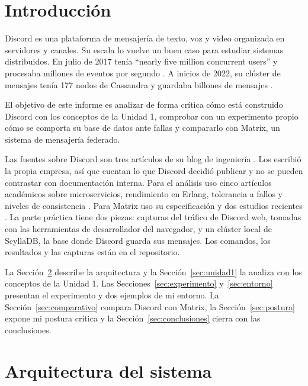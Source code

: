 \documentclass[11pt,a4paper]{article}
\begin{document}
\newpage
\tableofcontents
\newpage


\section{Introducción}\label{sec:introduccion}

Discord es una plataforma de mensajería de texto, voz y video organizada en servidores y canales. Su escala lo vuelve un buen caso para estudiar sistemas distribuidos. En julio de 2017 tenía \enquote{nearly five million concurrent users} y procesaba millones de eventos por segundo \cite{Vishnevskiy2017elixir}. A inicios de 2022, su clúster de mensajes tenía 177 nodos de Cassandra y guardaba billones de mensajes \cite{Ingram2023}.

El objetivo de este informe es analizar de forma crítica cómo está construido Discord con los conceptos de la Unidad 1, comprobar con un experimento propio cómo se comporta su base de datos ante fallas y compararlo con Matrix, un sistema de mensajería federado.

Las fuentes sobre Discord son tres artículos de su blog de ingeniería \cite{Vishnevskiy2017billions,Vishnevskiy2017elixir,Ingram2023}. Los escribió la propia empresa, así que cuentan lo que Discord decidió publicar y no se pueden contrastar con documentación interna. Para el análisis uso cinco artículos académicos sobre microservicios, rendimiento en Erlang, tolerancia a fallos y niveles de consistencia \cite{Blinowski2022,Cazzola2022,Rehman2022,Ferreira2025,Velepucha2023}. Para Matrix uso su especificación \cite{MatrixSpec} y dos estudios recientes \cite{Martins2026,Viana2026}. La parte práctica tiene dos piezas: capturas del tráfico de Discord web, tomadas con las herramientas de desarrollador del navegador, y un clúster local de ScyllaDB, la base donde Discord guarda sus mensajes. Los comandos, los resultados y las capturas están en el repositorio.

La Sección~\ref{sec:arquitectura} describe la arquitectura y la Sección~\ref{sec:unidad1} la analiza con los conceptos de la Unidad 1. Las Secciones~\ref{sec:experimento} y~\ref{sec:entorno} presentan el experimento y dos ejemplos de mi entorno. La Sección~\ref{sec:comparativo} compara Discord con Matrix, la Sección~\ref{sec:postura} expone mi postura crítica y la Sección~\ref{sec:conclusiones} cierra con las conclusiones.

\section{Arquitectura del sistema}\label{sec:arquitectura}
\end{document}
